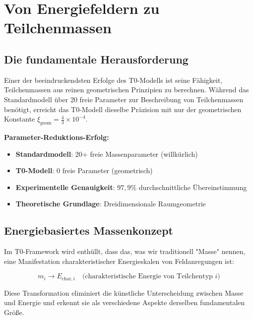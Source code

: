 \documentclass[12pt,a4paper]{article}
\newcommand{\xigeom}{\xi_{\text{geom}}}
\begin{document}
	\section{Von Energiefeldern zu Teilchenmassen}
	\label{sec:energy_fields_to_masses}
	
	\subsection{Die fundamentale Herausforderung}
	\label{subsec:fundamental_challenge}
	
	Einer der beeindruckendsten Erfolge des T0-Modells ist seine Fähigkeit, Teilchenmassen aus reinen geometrischen Prinzipien zu berechnen. Während das Standardmodell über 20 freie Parameter zur Beschreibung von Teilchenmassen benötigt, erreicht das T0-Modell dieselbe Präzision mit nur der geometrischen Konstante $\xigeom = \frac{4}{3} \times 10^{-4}$.
	
	\begin{tcolorbox}[colback=green!5!white,colframe=green!75!black,title=Massen-Revolution]
		\textbf{Parameter-Reduktions-Erfolg:}
		\begin{itemize}
			\item \textbf{Standardmodell}: 20+ freie Massenparameter (willkürlich)
			\item \textbf{T0-Modell}: 0 freie Parameter (geometrisch)
			\item \textbf{Experimentelle Genauigkeit}: $97,9\%$ durchschnittliche Übereinstimmung
			\item \textbf{Theoretische Grundlage}: Dreidimensionale Raumgeometrie
		\end{itemize}
	\end{tcolorbox}
	
	\subsection{Energiebasiertes Massenkonzept}
	\label{subsec:energy_based_mass}
	
	Im T0-Framework wird enthüllt, dass das, was wir traditionell "Masse" nennen, eine Manifestation charakteristischer Energieskalen von Feldanregungen ist:
	
	\begin{equation}
		\boxed{m_i \rightarrow E_{\text{char},i} \quad \text{(charakteristische Energie von Teilchentyp } i\text{)}}
		\label{eq:mass_to_energy}
	\end{equation}
	
	Diese Transformation eliminiert die künstliche Unterscheidung zwischen Masse und Energie und erkennt sie als verschiedene Aspekte derselben fundamentalen Größe.
	
\end{document}
